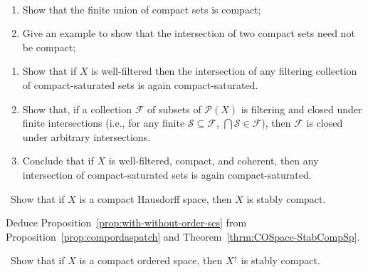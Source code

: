 \begin{exercise}\label{exer:coherence} \
\begin{enumerate}
\item Show that the finite union of compact sets is compact;
\item Give an example to show that the intersection of two compact sets need not be compact;
\end{enumerate}
\end{exercise}

\begin{exercise}\label{exer:well-filtered}
  \begin{enumerate}
  \item Show that if $X$ is well-filtered then the intersection of any filtering collection of compact-saturated sets is again compact-saturated.
  \item Show that, if a collection $\mathcal{F}$ of subsets of $\mathcal{P}(X)$ is filtering and closed under finite intersections (i.e., for any finite $\mathcal{S} \subseteq \mathcal{F}$, $\bigcap \mathcal{S} \in \mathcal{F}$), then $\mathcal{F}$ is closed under arbitrary intersections.
  \item Conclude that if $X$ is well-filtered, compact, and coherent, then any intersection of compact-saturated sets is again compact-saturated.
  \end{enumerate}
\end{exercise}

\begin{exercise}\label{exer:compHaus-stabcomp} \
 Show that if $X$ is a compact Hausdorff space, then $X$ is stably compact.
\end{exercise}
\begin{exercise}\label{exer:with-without-order}
Deduce Proposition~\ref{prop:with-without-order-scs} from Proposition~\ref{prop:compordaspatch} and Theorem~\ref{thrm:COSpace-StabCompSp}.
\end{exercise}

\begin{exercise}\label{exer:Xupstabcomp} \
 Show that if $X$ is a compact ordered space, then $X^\uparrow$ is stably compact.
\end{exercise}

